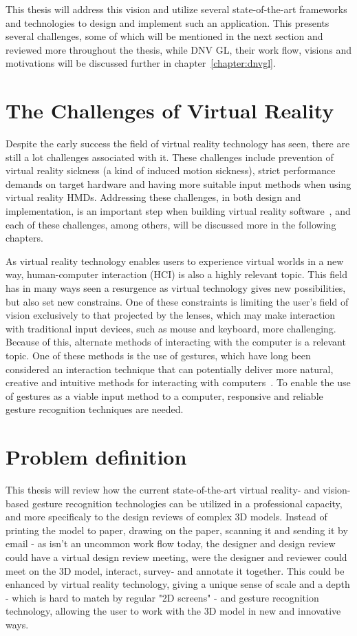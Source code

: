 This thesis will address this vision and utilize several state-of-the-art frameworks and technologies to design and implement such 
an application. This presents several challenges, some of which will be mentioned in the next section and reviewed more throughout the thesis, while 
DNV GL, their work flow, visions and motivations will be discussed further in chapter~\ref{chapter:dnvgl}. 


\section{The Challenges of Virtual Reality} 
Despite the early success the field of virtual reality technology has seen, there are still a lot challenges associated with it. 
These challenges include prevention of virtual reality sickness (a kind of induced motion sickness), 
strict performance demands on target hardware and having more suitable input methods when using virtual reality HMDs. %
Addressing these challenges, in both design and implementation, is an important step when building virtual reality software~\citep{OCULUS2016}, 
and each of these challenges, among others, will be discussed more in the following chapters.

As virtual reality technology enables users to experience virtual worlds in a new way, 
human-computer interaction (HCI) is also a highly relevant topic. 
This field has in many ways seen a resurgence as virtual technology gives new possibilities, but also set new constrains. 
One of these constraints is limiting the user's field of vision exclusively to that projected by the lenses, 
which may make interaction with traditional input devices, such as mouse and keyboard, more challenging. 
Because of this, alternate methods of interacting with the computer is a relevant topic. 
One of these methods is the use of gestures, 
which have long been considered an interaction technique that can potentially deliver more natural, 
creative and intuitive methods for interacting with computers~\citep{Rautaray2015}. 
To enable the use of gestures as a viable input method to a computer, responsive and reliable gesture recognition techniques are needed.  

\section{Problem definition}
This thesis will review how the current state-of-the-art virtual reality- and vision-based gesture recognition technologies can be utilized in a professional capacity, and more
specificaly to the design reviews of complex 3D models. 
Instead of printing the model to paper, drawing on the paper, scanning it and sending it by email - as isn't an uncommon work flow today, 
the designer and design review could have a virtual design review meeting, were the designer and reviewer could meet on the 3D model, interact, survey- and annotate it together. 
This could be enhanced by virtual reality technology, giving a unique sense of scale and a depth - which is hard to match by regular "2D screens" - and 
gesture recognition technology, allowing the user to work with the 3D model in new and innovative ways. 

